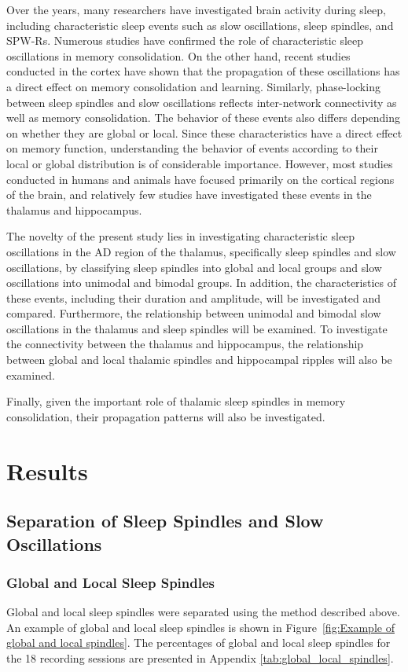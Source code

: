 \documentclass[12pt]{report}
\begin{document}
	Over the years, many researchers have investigated brain activity during sleep, including characteristic sleep events such as slow oscillations, sleep spindles, and SPW-Rs. Numerous studies have confirmed the role of characteristic sleep oscillations in memory consolidation. On the other hand, recent studies conducted in the cortex have shown that the propagation of these oscillations has a direct effect on memory consolidation and learning. Similarly, phase-locking between sleep spindles and slow oscillations reflects inter-network connectivity as well as memory consolidation. The behavior of these events also differs depending on whether they are global or local. Since these characteristics have a direct effect on memory function, understanding the behavior of events according to their local or global distribution is of considerable importance. However, most studies conducted in humans and animals have focused primarily on the cortical regions of the brain, and relatively few studies have investigated these events in the thalamus and hippocampus.
	
	The novelty of the present study lies in investigating characteristic sleep oscillations in the AD region of the thalamus, specifically sleep spindles and slow oscillations, by classifying sleep spindles into global and local groups and slow oscillations into unimodal and bimodal groups. In addition, the characteristics of these events, including their duration and amplitude, will be investigated and compared. Furthermore, the relationship between unimodal and bimodal slow oscillations in the thalamus and sleep spindles will be examined. To investigate the connectivity between the thalamus and hippocampus, the relationship between global and local thalamic spindles and hippocampal ripples will also be examined.
	
	Finally, given the important role of thalamic sleep spindles in memory consolidation, their propagation patterns will also be investigated.
	
	\chapter{Results}
	\label{ch:Results}
	\section{Separation of Sleep Spindles and Slow Oscillations}
	\label{Separation of Sleep Spindles and Slow Oscillations}
	\subsection{Global and Local Sleep Spindles}
	\label{Global and Local Sleep Spindles}
	Global and local sleep spindles were separated using the method described above. An example of global and local sleep spindles is shown in Figure~\ref{fig:Example of global and local spindles}.
	The percentages of global and local sleep spindles for the 18 recording sessions are presented in Appendix \ref{tab:global_local_spindles}.
	
\end{document}

